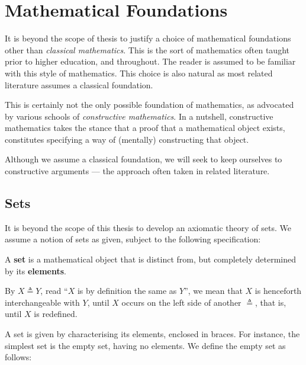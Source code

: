 \section{Mathematical Foundations}

\label{sec:preface:mathematical-foundations}

\def\strue{\ensuremath{\text{\textsc{True}}}}
\def\sfalse{\ensuremath{\text{\textsc{False}}}}

It is beyond the scope of thesis to justify a choice of mathematical
foundations other than \emph{classical mathematics}. This is the sort of
mathematics often taught prior to higher education, and throughout. The reader
is assumed to be familiar with this style of mathematics. This choice is also
natural as most related literature assumes a classical foundation.

This is certainly not the only possible foundation of mathematics, as advocated
by various schools of \emph{constructive mathematics}. In a nutshell,
constructive mathematics takes the stance that a proof that a mathematical
object exists, constitutes specifying a way of (mentally) constructing that
object.

Although we assume a classical foundation, we will seek to keep ourselves to
constructive arguments --- the approach often taken in related literature.

\subsection{Sets}

It is beyond the scope of this thesis to develop an axiomatic theory of sets.
We assume a notion of sets as given, subject to the following specification:

\begin{specification} A \textbf{set} is a mathematical object that is distinct
from, but completely determined by its \textbf{elements}. \end{specification}

\begin{notation} By $X\triangleq Y$, read ``$X$ is by definition the same as
$Y$'', we mean that $X$ is henceforth interchangeable with $Y$, until $X$
occurs on the left side of another $\triangleq$, that is, until $X$ is
redefined. \end{notation}

A set is given by characterising its elements, enclosed in braces. For
instance, the simplest set is the empty set, having no elements. We define the
empty set as follows:

